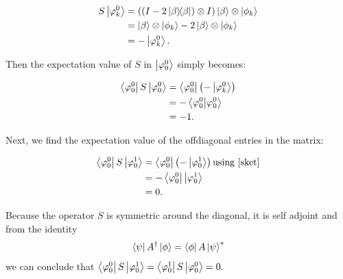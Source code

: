 \begin{align} \begin{split}
  \label{sket}
  S \ket{\varphi_k^0} &= ((I - 2\dyad{\beta}{\beta}) \otimes I) \ket{\beta} \otimes \ket{\phi_k}\\
  &= \ket{\beta} \otimes \ket{\phi_k} - 2 \ket{\beta} \otimes \ket{\phi_k}\\
  &= - \ket{\varphi_k^0}.
\end{split} \end{align}

Then the expectation value of $S$ in $\left\vert{\varphi_0^0}\right\rangle$ simply becomes:

\begin{align} \begin{split}
\left\langle{\varphi_0^0}\right\vert S\left\vert{\varphi_0^0}\right\rangle &= \left\langle{\varphi_0^0}\right\vert \left( - \left\vert{\varphi_k^0}\right\rangle \right)\\
&= - \braket{\varphi_0^0}{\varphi_0^0}\\
&= - 1.
\end{split} \end{align}

Next, we find the expectation value of the offdiagonal entries in the matrix:

\begin{align} \begin{split}
\left\langle{\varphi_0^0}\right\vert S\left\vert{\varphi_0^1}\right\rangle &= \left\langle{\varphi_0^0}\right\vert \left(- \left\vert{\varphi_0^1}\right\rangle\right) \text{using \ref{sket}}\\
&= - \left\langle{\varphi_0^0}\right\vert \left\vert{\varphi_0^1}\right\rangle\\
&= 0.
\end{split} \end{align}

Because the operator $S$ is symmetric around the diagonal, it is self adjoint and from the identity \cite{nielsen} $$\left\langle{\psi}\right\vert A^{\dagger}\left\vert{\phi}\right\rangle= \left\langle{\phi}\right\vert A \left\vert{\psi}\right\rangle^{*}$$
we can conclude that $\left\langle{\varphi_0^0}\right\vert S\left\vert{\varphi_0^1}\right\rangle = \left\langle{\varphi_0^1}\right\vert S\left\vert{\varphi_0^0}\right\rangle = 0.$

